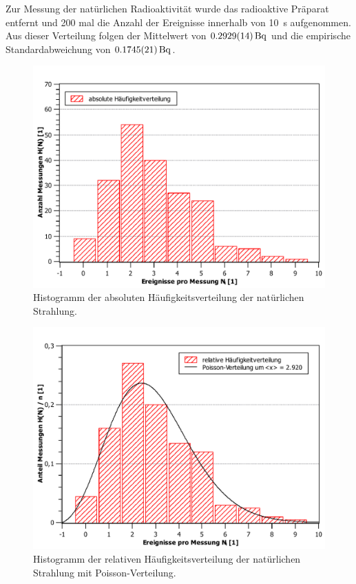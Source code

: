 	Zur Messung der natürlichen Radioaktivität wurde das radioaktive Präparat entfernt und 200 mal die Anzahl der Ereignisse innerhalb von \SI{10}{\second} aufgenommen.
	Aus dieser Verteilung folgen der Mittelwert von $\SI{0.2929+-0.0014}{\becquerel}$ und die empirische Standardabweichung von $\SI{0.1745+-0.0021}{\becquerel}$. 
	\begin{figure}[ht]
		\centering
		\includegraphics[width=\textwidth]{data/bckgndHistogrammAbs.pdf}
		\caption{Histogramm der absoluten Häufigkeitsverteilung der natürlichen Strahlung.}
		\label{fig:absolut}	
	\end{figure}
	\begin{figure}[ht]
		\centering
		\includegraphics[width=\textwidth]{data/bckgndHistogrammRelPoisson.pdf}
		\caption{Histogramm der relativen Häufigkeitsverteilung der natürlichen Strahlung mit Poisson-Verteilung.}
		\label{fig:relativ}	
	\end{figure}

